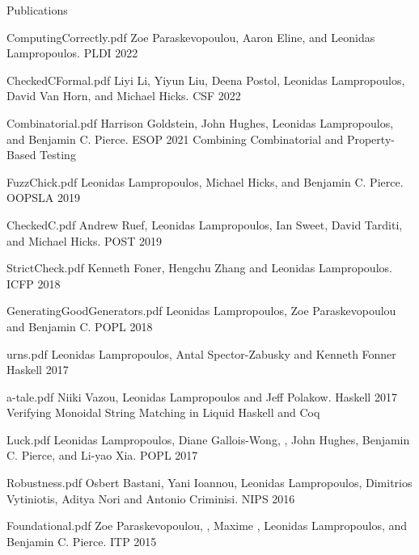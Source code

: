 \documentclass{resume} %
\begin{document}
\begin{rSection}{Publications}

    {ComputingCorrectly.pdf}
    {Zoe Paraskevopoulou, Aaron Eline, and Leonidas Lampropoulos.}
    {PLDI 2022}
  
    {CheckedCFormal.pdf}
    {Liyi Li, Yiyun Liu, Deena Postol, Leonidas Lampropoulos, David Van Horn, and Michael Hicks.}
    {CSF 2022}

    {Combinatorial.pdf}
    {Harrison Goldstein, John Hughes, Leonidas Lampropoulos, and Benjamin C. Pierce.}
    {ESOP 2021}
    {Combining Combinatorial and Property-Based Testing}    
    
    {FuzzChick.pdf}
    {Leonidas Lampropoulos, Michael Hicks, and Benjamin C. Pierce.}
    {OOPSLA 2019}
    
    {CheckedC.pdf}
    {Andrew Ruef, Leonidas Lampropoulos, Ian Sweet, David Tarditi, and Michael Hicks.}
    {POST 2019}

    {StrictCheck.pdf}
    {Kenneth Foner, Hengchu Zhang and Leonidas Lampropoulos.}
    {ICFP 2018}

    {GeneratingGoodGenerators.pdf}
    {Leonidas Lampropoulos, Zoe Paraskevopoulou and Benjamin C.}
    {POPL 2018}

    {urns.pdf}
    {Leonidas Lampropoulos, Antal Spector-Zabusky and Kenneth Fonner}
    {Haskell 2017}

    {a-tale.pdf}
    {Niiki Vazou, Leonidas Lampropoulos and Jeff Polakow.}
    {Haskell 2017}
    {Verifying Monoidal String Matching in Liquid Haskell and Coq}

    {Luck.pdf}
    {Leonidas Lampropoulos, Diane Gallois-Wong, \Catalin \Hritcu, John Hughes, Benjamin C. Pierce, and Li-yao Xia.}
    {POPL 2017}

    {Robustness.pdf}
    {Osbert Bastani, Yani Ioannou, Leonidas Lampropoulos, Dimitrios Vytiniotis, Aditya Nori and Antonio Criminisi.}
    {NIPS 2016}

    {Foundational.pdf}
    {Zoe Paraskevopoulou, \Catalin \Hritcu, Maxime \Denes, Leonidas Lampropoulos, and Benjamin C. Pierce.}
    {ITP 2015}
    

\end{rSection}
\end{document}
